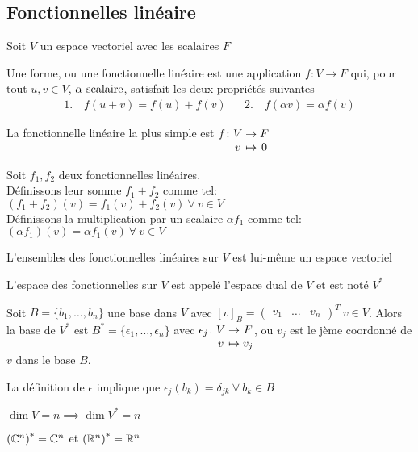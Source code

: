 
\subsection{Fonctionnelles linéaire}
Soit $V$ un espace vectoriel avec les scalaires $F$
\begin{definition}
    Une forme, ou une fonctionnelle linéaire est une application
    $f\colon V \to F$ qui, pour tout $u, v \in V$, $\alpha \text{ scalaire}$,
    satisfait les deux propriétés suivantes
    \begin{align*}
        1. \quad f(u + v) = f(u) + f(v)& &2. \quad f(\alpha v) = \alpha f(v)
    \end{align*}
\end{definition}
\begin{remark}
    La fonctionnelle linéaire la plus simple est $\myfunc{f}{V}{F}{v}{0}$
\end{remark}
\begin{definition}
    Soit $f_1, f_2$ deux fonctionnelles linéaires. \\
    Définissons leur somme $f_1 + f_2$ comme tel:
    $(f_1 + f_2)(v) = f_1(v) + f_2(v) \ \forall \ v \in V $ \\
    Définissons la multiplication par un scalaire $\alpha f_1$ comme tel: 
    $(\alpha f_1)(v) = \alpha f_1(v) \ \forall \ v \in V$
\end{definition}
\begin{lemma}
    L'ensembles des fonctionnelles linéaires sur $V$ est lui-même un espace vectoriel
\end{lemma}
\begin{definition}
    L'espace des fonctionnelles sur $V$ est appelé l'espace dual de $V$ et est noté $V^*$
\end{definition}
\begin{theorem}
    Soit $B = \{b_1, \dots, b_n\}$ une base dans $V$ avec $[v]_B = \begin{pmatrix}
        v_1 & \dots & v_n \end{pmatrix}^T \ v \in V$. 
    Alors la base de $V^*$ est $B^* = \{\epsilon_1, \dots, \epsilon_n\}$ avec 
    $\myfunc{\epsilon_j}{V}{F}{v}{v_j}$, ou $v_j$ est le jème coordonné de $v$ dans le base $B$.
\end{theorem}
\begin{remark}
    La définition de $\epsilon$ implique que $\epsilon_j(b_k) = \delta_{jk} \ \forall \ b_k \in B$
\end{remark}
\begin{corollary}
    $\dim V = n \implies \dim V^* = n$
\end{corollary}
\begin{corollary}
    $\left(\mathbb{C}^n\right)^* = \mathbb{C}^n$ et $\left(\mathbb{R}^n\right)^* = \mathbb{R}^n$ 
\end{corollary}

